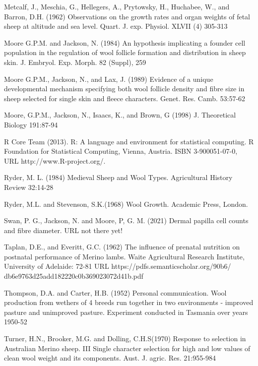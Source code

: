 \documentclass[titlepage]{article}  %
\begin{document}
\begin{thebibliography}{}
Metcalf, J., Meschia, G., Hellegers, A., Prytowsky, H., Huchabee, W., and Barron, D.H. (1962) Observations on the growth rates and organ weights of fetal sheep at altitude and sea level. Quart. J. exp. Physiol. XLVII (4) 305-313

Moore G.P.M. and Jackson, N. (1984) An hypothesis implicating a founder cell population in the regulation of wool follicle formation and distribution in sheep skin. J. Embryol. Exp. Morph. 82 (Suppl), 259

Moore G.P.M., Jackson, N., and Lax, J. (1989) Evidence of a unique developmental mechanism specifying both wool follicle density and fibre size in sheep selected for single skin and fleece characters. Genet. Res. Camb. 53:57-62

Moore, G.P.M., Jackson, N., Isaacs, K., and Brown, G (1998) J. Theoretical Biology 191:87-94

R Core Team (2013). R: A language and environment for statistical
  computing. R Foundation for Statistical Computing, Vienna, Austria.
  ISBN 3-900051-07-0, URL http://www.R-project.org/.

Ryder, M. L. (1984) Medieval Sheep and Wool Types.  Agricultural History Review 32:14-28

Ryder, M.L. and Stevenson, S.K.(1968) Wool Growth. Academic Press, London.

Swan, P. G., Jackson, N. and Moore, P, G. M. (2021) Dermal papilla cell counts and fibre diameter. URL  not there yet!

Taplan, D.E., and Everitt, G.C. (1962) The influence of prenatal nutrition on postnatal performance of Merino lambs. Waite Agricultural Research Institute, University of Adelaide: 72-81
URL https://pdfs.semanticscholar.org/90b6/
db6e9763d25add182220c0b369023072d41b.pdf

Thompson, D.A. and Carter, H.B. (1952) Personal communication. Wool production from wethers of 4 breeds run together in two environments - improved pasture and unimproved pasture. Experiment conducted in Tasmania over years 1950-52

Turner, H.N., Brooker, M.G. and Dolling, C.H.S(1970) Response to selection in Australian Merino sheep. III Single character selection for high and low values of clean wool weight and its components. Aust. J. agric. Res. 21:955-984


\end{thebibliography}
\end{document}
